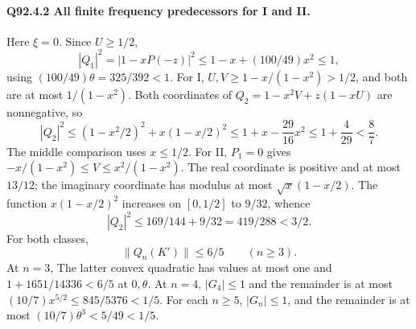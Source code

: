 \paragraph{Q92.4.2 All finite frequency predecessors for I and II.}
Here \(\xi=\allowbreak 0\). Since \(U\ge\allowbreak 1/2\),
\begin{equation}\tag{Q92.4.7}\label{eq:Q92:4.7}
|Q_1|^2=|1-xP(-z)|^2\le1-x+(100/49)x^2\le1,
\end{equation}
using \((100/49)\theta=\allowbreak 325/392<\allowbreak 1\).
For I, \(U,\allowbreak V\ge\allowbreak 1-x/(1-x^2)>\allowbreak 1/2\), and both are at most
\(1/(1-x^2)\). Both coordinates of
\(Q_2=\allowbreak 1-x^2V+z(1-xU)\) are nonnegative, so
\begin{equation}\tag{Q92.4.8}\label{eq:Q92:4.8}
|Q_2|^2\le(1-x^2/2)^2+x(1-x/2)^2
\le1+x-\frac{29}{16}x^2\le1+\frac4{29}<\frac87.
\end{equation}
The middle comparison uses \(x\le\allowbreak 1/2\). For II, \(P_1=\allowbreak 0\) gives
\(-x/(1-x^2)\le\allowbreak  V\le\allowbreak  x^2/(1-x^2)\).
The real coordinate is positive and at most \(13/12\); the imaginary
coordinate has modulus at most \(\sqrt x(1-x/2)\).
The function \(x(1-x/2)^2\) increases on \([0,\allowbreak 1/2]\) to \(9/32\), whence
\begin{equation}\tag{Q92.4.9}\label{eq:Q92:4.9}
|Q_2|^2\le169/144+9/32=419/288<3/2.
\end{equation}
For both classes,
\begin{equation}\tag{Q92.4.10}\label{eq:Q92:4.10}
\boxed{\|Q_n(K')\|\le6/5\qquad(n\ge3).}
\end{equation}
At \(n=\allowbreak 3\),
The latter convex quadratic has values at most one and
\(1+1651/14336<\allowbreak 6/5\) at \(0,\allowbreak \theta\).
At \(n=\allowbreak 4\), \(|G_4|\le\allowbreak 1\) and the remainder is at most
\((10/7)x^{5/2}\le\allowbreak 845/5376<\allowbreak 1/5\).
For each \(n\ge\allowbreak 5\), \(|G_n|\le\allowbreak 1\), and the remainder is at most
\((10/7)\theta^3<\allowbreak 5/49<\allowbreak 1/5\).

